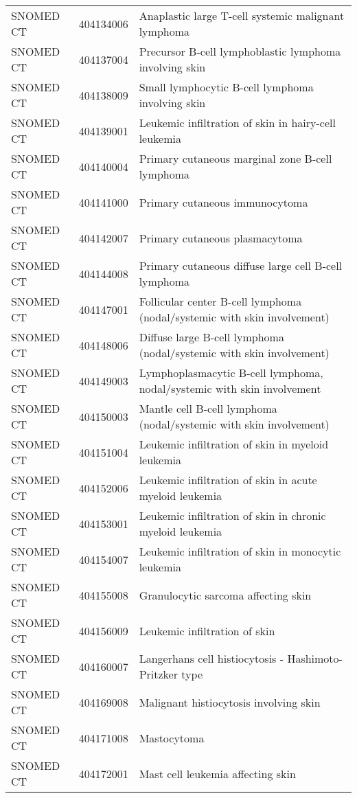 \begin{longtable}{p{}p{}p{}}
  SNOMED CT & 404134006 & Anaplastic large T-cell systemic malignant lymphoma \\ 
  SNOMED CT & 404137004 & Precursor B-cell lymphoblastic lymphoma involving skin \\ 
  SNOMED CT & 404138009 & Small lymphocytic B-cell lymphoma involving skin \\ 
  SNOMED CT & 404139001 & Leukemic infiltration of skin in hairy-cell leukemia \\ 
  SNOMED CT & 404140004 & Primary cutaneous marginal zone B-cell lymphoma \\ 
  SNOMED CT & 404141000 & Primary cutaneous immunocytoma \\ 
  SNOMED CT & 404142007 & Primary cutaneous plasmacytoma \\ 
  SNOMED CT & 404144008 & Primary cutaneous diffuse large cell B-cell lymphoma \\ 
  SNOMED CT & 404147001 & Follicular center B-cell lymphoma (nodal/systemic with skin involvement) \\ 
  SNOMED CT & 404148006 & Diffuse large B-cell lymphoma (nodal/systemic with skin involvement) \\ 
  SNOMED CT & 404149003 & Lymphoplasmacytic B-cell lymphoma, nodal/systemic with skin involvement \\ 
  SNOMED CT & 404150003 & Mantle cell B-cell lymphoma (nodal/systemic with skin involvement) \\ 
  SNOMED CT & 404151004 & Leukemic infiltration of skin in myeloid leukemia \\ 
  SNOMED CT & 404152006 & Leukemic infiltration of skin in acute myeloid leukemia \\ 
  SNOMED CT & 404153001 & Leukemic infiltration of skin in chronic myeloid leukemia \\ 
  SNOMED CT & 404154007 & Leukemic infiltration of skin in monocytic leukemia \\ 
  SNOMED CT & 404155008 & Granulocytic sarcoma affecting skin \\ 
  SNOMED CT & 404156009 & Leukemic infiltration of skin \\ 
  SNOMED CT & 404160007 & Langerhans cell histiocytosis - Hashimoto-Pritzker type \\ 
  SNOMED CT & 404169008 & Malignant histiocytosis involving skin \\ 
  SNOMED CT & 404171008 & Mastocytoma \\ 
  SNOMED CT & 404172001 & Mast cell leukemia affecting skin \\ 

\end{longtable}
